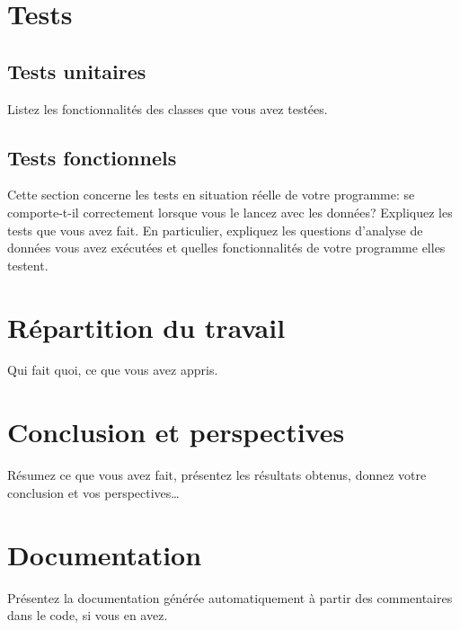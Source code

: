 \documentclass[11pt,a4paper]{article}
\begin{document}
\section{Tests}

\subsection{Tests unitaires}

Listez les fonctionnalités des classes que vous avez testées.

\subsection{Tests fonctionnels}

Cette section concerne les tests en situation réelle de votre programme: se comporte-t-il correctement lorsque vous le lancez avec les données?
Expliquez les tests que vous avez fait.
En particulier, expliquez les questions d'analyse de données vous avez exécutées et quelles fonctionnalités de votre programme elles testent.

% 

\section{Répartition du travail}

Qui fait quoi, ce que vous avez appris.

\section{Conclusion et perspectives}

Résumez ce que vous avez fait, présentez les résultats obtenus, donnez votre conclusion et vos perspectives\dots

% 
% 

\appendix

\appendixpage
\addappheadtotoc

\section{Documentation}

Présentez la documentation générée automatiquement à partir des commentaires dans le code, si vous en avez.
\end{document}
